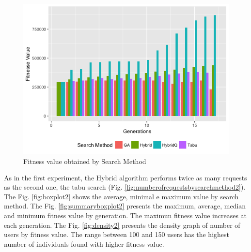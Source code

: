 \begin{figure}[h]
\centering
\includegraphics[width=.9\textwidth]{./images/experiment2-7.png}
\caption{Fitness value obtained by Search Method}
\label{fig:fitnessbygeneration2}
\end{figure}

As in the first experiment, the Hybrid algorithm performs twice as many requests as the second one, the tabu search (Fig. \ref{fig:numberofrequestsbysearchmethod2}). The Fig. \ref{fig:boxplot2} shows the average, minimal e maximum value by search method. The Fig. \ref{fig:summaryboxplot2} presents the maximum, average, median and minimum fitness value by generation. The maximun fitness value increases at each generation. The Fig. \ref{fig:density2} presents the density graph of number of users by fitness value. The range between 100 and 150 users has the highest number of individuals found with higher fitness value.


